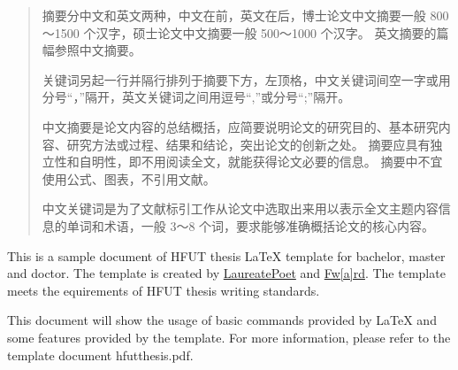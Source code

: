 

\begin{abstract}
  摘要分中文和英文两种，中文在前，英文在后，博士论文中文摘要一般 800～1500 个汉字，硕士论文中文摘要一般 500～1000 个汉字。
  英文摘要的篇幅参照中文摘要。

  关键词另起一行并隔行排列于摘要下方，左顶格，中文关键词间空一字或用分号“，”隔开，英文关键词之间用逗号“,”或分号“;”隔开。

  中文摘要是论文内容的总结概括，应简要说明论文的研究目的、基本研究内容、研究方法或过程、结果和结论，突出论文的创新之处。
  摘要应具有独立性和自明性，即不用阅读全文，就能获得论文必要的信息。
  摘要中不宜使用公式、图表，不引用文献。

  中文关键词是为了文献标引工作从论文中选取出来用以表示全文主题内容信息的单词和术语，一般 3～8 个词，要求能够准确概括论文的核心内容。
\end{abstract}

\begin{abstract*}
  This is a sample document of HFUT thesis \LaTeX{} template for bachelor,
  master and doctor. The template is created by \href{https://github.com/LaureatePoet}{LaureatePoet} and \href{https://github.com/HowardZorn}{Fw[a]rd}. The 
  template meets the equirements of HFUT thesis writing standards.

  This document will show the usage of basic commands provided by \LaTeX{} and
  some features provided by the template. For more information, please refer to
  the template document hfutthesis.pdf.
\end{abstract*}
